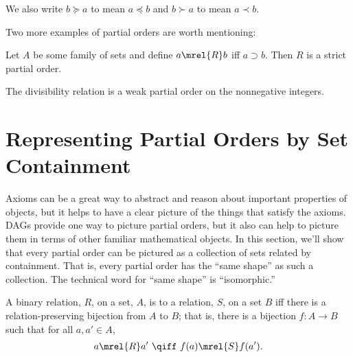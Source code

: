 \begin{editingnotes}

We also write $b \succeq a$ to
mean $a \preceq b$ and $b \succ a$ to mean $a \prec b$.

\end{editingnotes}

Two more examples of partial orders are worth mentioning:

\begin{example}\label{supset}
Let $A$ be some family of sets and define $a \mrel{R} b$ iff $a
\supset b$.  Then $R$ is a strict partial order.
\end{example}

\iffalse
For integers, $m,n$ we write $m \divides n$ to mean that $m$
\emph{divides} $n$, namely, there is an integer, $k$, such that $n=km$.
\fi

\begin{example}\label{divides}
The divisibility relation is a weak partial order on the nonnegative integers.
\end{example}

\section{Representing Partial Orders by Set Containment}\label{poset-as-sets_sec}

Axioms can be a great way to abstract and reason about important
properties of objects, but it helps to have a clear picture of the
things that satisfy the axioms.  DAGs provide one way to picture
partial orders, but it also can help to picture them in terms of other
familiar mathematical objects.  In this section, we'll show that every
partial order can be pictured as a collection of sets related by
containment.  That is, every partial order has the ``same shape'' as
such a collection.  The technical word for ``same shape'' is
``isomorphic.''

\begin{definition}\label{relation-isomorphism}
  A binary relation, $R$, on a set, $A$, is
   to a relation, $S$, on a set $B$ iff there is a
  relation-preserving bijection from $A$ to $B$; that is, there is
  a bijection $f:A \to B$ such that for all $a,a' \in A$,
  \[
  a \mrel{R} a'\ \qiff\ f(a) \mrel{S} f(a').
  \]
\end{definition}

